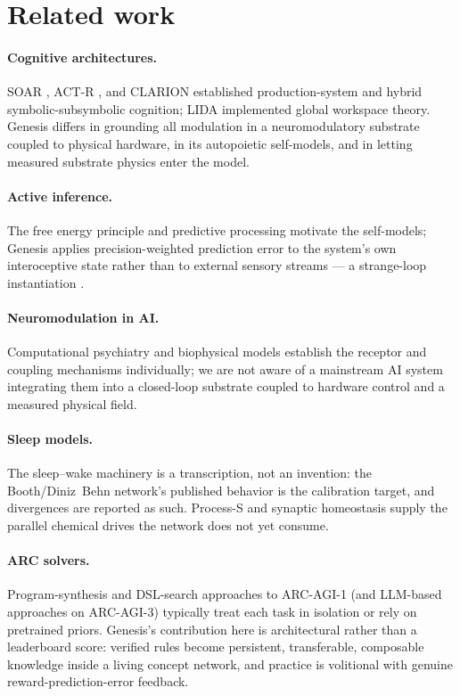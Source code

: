 \documentclass[11pt]{article}
\begin{document}
\section{Related work}

\paragraph{Cognitive architectures.} SOAR \cite{soar}, ACT-R \cite{actr}, and CLARION \cite{clarion}
established production-system and hybrid symbolic-subsymbolic
cognition; LIDA \cite{lida} implemented global workspace theory. Genesis differs
in grounding all modulation in a neuromodulatory substrate coupled to
physical hardware, in its autopoietic self-models, and in letting
measured substrate physics enter the model.

\paragraph{Active inference.} The free energy principle and predictive
processing motivate the self-models; Genesis applies precision-weighted
prediction error to the system's own interoceptive state rather than to
external sensory streams --- a strange-loop instantiation \cite{hofstadter}.

\paragraph{Neuromodulation in AI.} Computational psychiatry and
biophysical models establish the receptor and coupling mechanisms
individually; we are not aware of a mainstream AI system integrating
them into a closed-loop substrate coupled to hardware control and a
measured physical field.

\paragraph{Sleep models.} The sleep--wake machinery is a transcription,
not an invention: the Booth/Diniz~Behn network's published behavior is
the calibration target, and divergences are reported as such. Process-S
and synaptic homeostasis \cite{tononi} supply the parallel chemical drives the
network does not yet consume.

\paragraph{ARC solvers.} Program-synthesis and DSL-search approaches to
ARC-AGI-1 (and LLM-based approaches on ARC-AGI-3) typically treat each
task in isolation or rely on pretrained priors. Genesis's contribution
here is architectural rather than a leaderboard score: verified rules
become persistent, transferable, composable knowledge inside a living
concept network, and practice is volitional with genuine
reward-prediction-error feedback.
\end{document}
